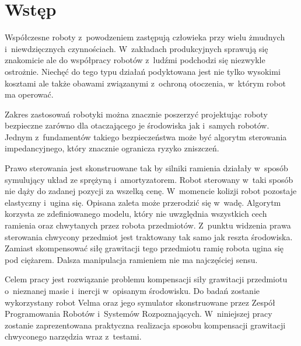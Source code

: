
\chapter{Wstęp\label{chap:wstep}}

	Współczesne roboty z~powodzeniem zastępują człowieka przy wielu żmudnych i~niewdzięcznych czynnościach.  W~zakładach produkcyjnych sprawują się znakomicie ale do współpracy robotów z~ludźmi podchodzi się niezwykle ostrożnie. Niechęć do tego typu działań podyktowana jest nie tylko wysokimi kosztami ale także obawami związanymi z~ochroną otoczenia, w~którym robot ma operować.
	
	Zakres zastosowań robotyki można znacznie poszerzyć projektując roboty bezpieczne zarówno dla otaczającego je środowiska jak i~samych robotów. Jednym z~fundamentów takiego bezpieczeństwa może być algorytm sterowania impedancyjnego, który znacznie ogranicza ryzyko zniszczeń. 
	
	Prawo sterowania jest skonstruowane tak by silniki ramienia działały w~sposób symulujący układ ze sprężyną i~amortyzatorem. Robot sterowany w~taki sposób nie dąży do zadanej pozycji za wszelką cenę. W~momencie kolizji robot pozostaje elastyczny i~ugina się. Opisana zaleta może przerodzić się w~wadę. Algorytm korzysta ze zdefiniowanego modelu, który nie uwzględnia wszystkich cech ramienia oraz chwytanych przez robota przedmiotów. Z~punktu widzenia prawa sterowania chwycony przedmiot jest traktowany tak samo jak reszta środowiska. Zamiast skompensować siłę grawitacji tego przedmiotu ramię robota ugina się pod ciężarem. Dalsza manipulacja ramieniem nie ma najczęściej sensu. 

	Celem pracy jest rozwiązanie problemu kompensacji siły grawitacji przedmiotu o~nieznanej masie i~inercji w~opisanym środowisku. 
	Do badań zostanie wykorzystany robot Velma oraz jego symulator skonstruowane przez Zespół Programowania Robotów i~Systemów Rozpoznających. W~niniejszej pracy zostanie zaprezentowana praktyczna realizacja sposobu kompensacji grawitacji chwyconego narzędzia wraz z~testami.

